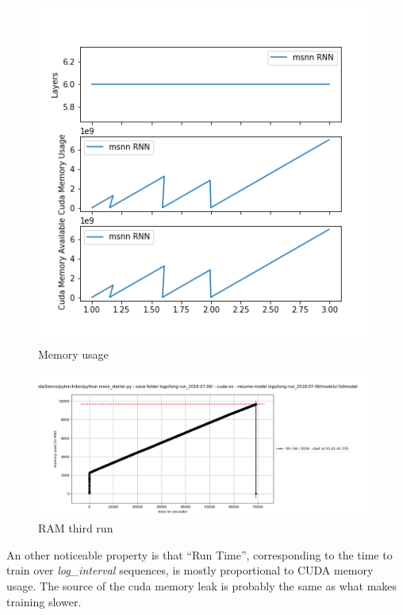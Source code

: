 \begin{figure}[h]
\centering
\includegraphics{parts/appendix/reports-gmsnn/docs_esteban-latex/test_reports/2018-06-11/memory.png}
\caption{Memory usage}
\end{figure}

\begin{figure}[h]
\centering
\includegraphics[width=\textwidth]{parts/appendix/reports-gmsnn/docs_esteban-latex/test_reports/2018-06-11/RAM_restart-2.png}
\caption{RAM third run}
\end{figure}

An other noticeable property is that ``Run Time'', corresponding to the
time to train over \emph{log\_interval} sequences, is mostly
proportional to CUDA memory usage. The source of the cuda memory leak is
probably the same as what makes training slower.

